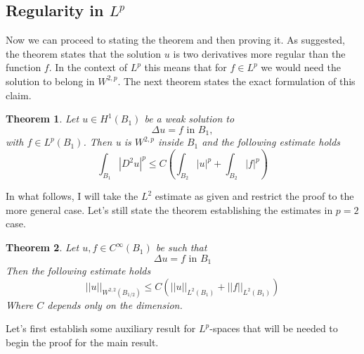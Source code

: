 \documentclass[12pt]{artikel1}
\newtheorem{theorem}{Theorem}[section]
\begin{document}
\subsection*{Regularity in $L^p$}

Now we can proceed to stating the theorem and then proving it. As suggested, the theorem states that the solution $u$ is two derivatives more regular than the function $f$. In the context of $L^p$ this means that for $f\in L^p$ we would need the solution to belong in $W^{2,p}$. The next theorem states the exact formulation of this claim.

\begin{theorem}\label{thm:main}
    Let $u\in H^1(B_1)$ be a weak solution to
    \begin{equation*}
        \Delta u=f\text{ in }B_1,
    \end{equation*}
    with $f\in L^p(B_1)$. Then u is $W^{2,p}$ inside $B_1$ and the following estimate holds
    \begin{equation*}
        \int_{B_1}|D^2u|^p\leq C\left(\int_{B_2}|u|^p+\int_{B_2}|f|^p\right)
    \end{equation*}
\end{theorem}

In what follows, I will take the $L^2$ estimate as given and restrict the proof to the more general case. Let's still state the theorem establishing the estimates in $p=2$ case.

\begin{theorem}\label{thm:L2}
    Let $u,f\in C^{\infty}(B_1)$ be such that
    \begin{equation*}
        \Delta u=f\text{ in }B_1
    \end{equation*}
    Then the following estimate holds
    \begin{equation*}
        ||u||_{W^{2,2}(B_{1/2})}\leq C\left(||u||_{L^2(B_1)}+||f||_{L^2(B_1)}\right)
    \end{equation*}
    Where $C$ depends only on the dimension.
\end{theorem}

Let's first establish some auxiliary result for $L^p$-spaces that will be needed to begin the proof for the main result. 
\end{document}
